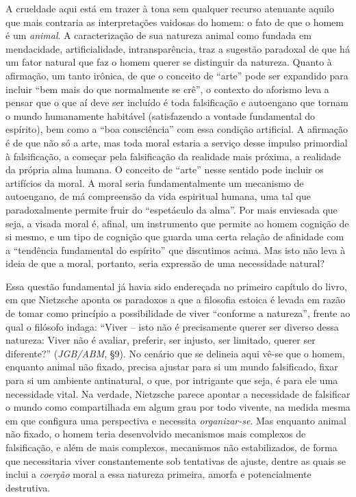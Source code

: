 \documentclass[
	12pt,				%
	openright,			%
	oneside,			%
	a4paper,			%
	english,			%
	french,				%
	spanish,			%
	brazil				%
	]{abntex2}
\begin{document}
A crueldade aqui está em trazer à tona sem qualquer recurso atenuante aquilo que mais contraria as interpretações vaidosas do homem: o fato de que o homem é um \textit{animal}. A caracterização de sua natureza animal como fundada em mendacidade, artificialidade, intransparência, traz a sugestão paradoxal de que há um fator natural que faz o homem querer se distinguir da natureza. Quanto à afirmação, um tanto irônica, de que o conceito de “arte” pode ser expandido para  incluir “bem mais do que normalmente se crê”, o contexto do aforismo leva a pensar que o que aí deve ser incluído é toda falsificação e autoengano que tornam o mundo humanamente habitável (satisfazendo a vontade fundamental do espírito), bem como a “boa consciência” com essa condição artificial. A afirmação é de que não só a arte, mas toda moral estaria a serviço desse impulso primordial à falsificação, a começar pela falsificação da realidade mais próxima, a realidade da própria alma humana. O conceito de “arte” nesse sentido pode incluir os artifícios da moral. A moral seria fundamentalmente um mecanismo de autoengano, de má compreensão da vida espiritual humana, uma tal que paradoxalmente permite fruir do “espetáculo da alma”. Por mais enviesada que seja, a visada moral é, afinal, um instrumento que permite ao homem cognição de si mesmo, e um tipo de cognição que guarda uma certa relação de afinidade com a “tendência fundamental do espírito” que discutimos acima. Mas isto não leva à ideia de que a moral, portanto, seria expressão de uma necessidade natural?

Essa questão fundamental já havia sido endereçada no primeiro capítulo do livro, em que Nietzsche aponta os paradoxos a que a filosofia estoica é levada em razão de tomar como princípio a possibilidade de viver “conforme a natureza”, frente ao qual o filósofo indaga: “Viver – isto não é precisamente querer ser diverso dessa natureza: Viver não é avaliar, preferir, ser injusto, ser limitado, querer ser diferente?” (\textit{JGB/ABM}, §9). No cenário que se delineia aqui vê-se que o homem, enquanto animal não fixado, precisa ajustar para si um mundo falsificado, fixar para si um ambiente antinatural, o que, por intrigante que seja, é para ele uma necessidade vital. Na verdade, Nietzsche parece apontar a necessidade de falsificar o mundo como compartilhada em algum grau por todo vivente, na medida mesma em que configura uma perspectiva e necessita \textit{organizar-se}. Mas enquanto animal não fixado, o homem teria desenvolvido mecanismos mais complexos de falsificação, e além de mais complexos, mecanismos não estabilizados, de forma que necessitaria viver constantemente sob tentativas de ajuste, dentre as quais se inclui a \textit{coerção} moral a essa natureza primeira, amorfa e potencialmente destrutiva.
\end{document}
